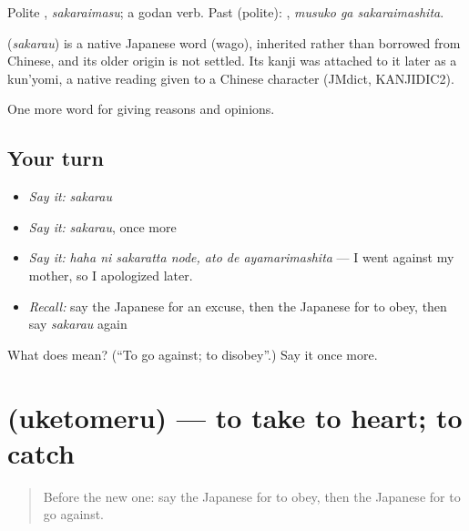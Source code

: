 Polite \textbf{}, \emph{sakaraimasu}; a godan verb. Past (polite): \textbf{ }, \emph{musuko ga sakaraimashita}.

\begin{cousinweb}
\textbf{} (\emph{sakarau}) is a native Japanese word (wago), inherited rather than borrowed from Chinese, and its older origin is not settled. Its kanji was attached to it later as a kun'yomi, a native reading given to a Chinese character (JMdict, KANJIDIC2).
\end{cousinweb}

\begin{grammarlens}[title={What you've built}]
One more word for giving reasons and opinions.
\end{grammarlens}

\subsection*{Your turn}
\begin{itemize}
\raggedright
  \item \emph{Say it:} \emph{sakarau}
  \item \emph{Say it:} \emph{sakarau}, once more
  \item \emph{Say it:} \emph{haha ni sakaratta node, ato de ayamarimashita} — I went against my mother, so I apologized later.
  \item \emph{Recall:} say the Japanese for an excuse, then the Japanese for to obey, then say \emph{sakarau} again
\end{itemize}

\begin{tcolorbox}[breakable,colback=teal!4,colframe=teal!35!black,title={Before you move on}]
What does  mean? (\textquotedblleft{}To go against; to disobey\textquotedblright{}.) Say it once more.
\end{tcolorbox}
\section[\texorpdfstring{\ja{うけとめる} (uketomeru)}{うけとめる (uketomeru)}]{ (uketomeru) — to take to heart; to catch}

\label{lesson:JA-C325-uketomeru}



\begin{quote}
Before the new one: say the Japanese for to obey, then the Japanese for to go against.
\end{quote}

